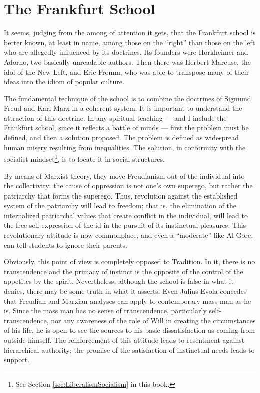 \section{The Frankfurt School}

It seems, judging from the among of attention it gets, that the Frankfurt school is better known, at least in name, among those on the ``right'' than those on the left who are allegedly influenced by its doctrines. Its founders were Horkheimer and Adorno, two basically unreadable authors. Then there was Herbert Marcuse, the idol of the New Left, and Eric Fromm, who was able to transpose many of their ideas into the idiom of popular culture.

The fundamental technique of the school is to combine the doctrines of Sigmund Freud and Karl Marx in a coherent system. It is important to understand the attraction of this doctrine. In any spiritual teaching --- and I include the Frankfurt school, since it reflects a battle of minds --- first the problem must be defined, and then a solution proposed. The problem is defined as widespread human misery resulting from inequalities. The solution, in conformity with the socialist mindset\footnote{See Section \ref{sec:LiberalismSocialism} in this book.}, is to locate it in social structures.

By means of Marxist theory, they move Freudianism out of the individual into the collectivity: the cause of oppression is not one's own superego, but rather the patriarchy that forms the superego. Thus, revolution against the established system of the patriarchy will lead to freedom; that is, the elimination of the internalized patriarchal values that create conflict in the individual, will lead to the free self-expression of the id in the pursuit of its instinctual pleasures. This revolutionary attitude is now commonplace, and even a ``moderate'' like Al Gore, can tell students to ignore their parents.

Obviously, this point of view is completely opposed to Tradition. In it, there is no transcendence and the primacy of instinct is the opposite of the control of the appetites by the spirit. Nevertheless, although the school is false in what it denies, there may be some truth in what it asserts. Even Julius Evola concedes that Freudian and Marxian analyses can apply to contemporary mass man as he is. Since the mass man has no sense of transcendence, particularly self-transcendence, nor any awareness of the role of Will in creating the circumstances of his life, he is open to see the sources to his basic dissatisfaction as coming from outside himself. The reinforcement of this attitude leads to resentment against hierarchical authority; the promise of the satisfaction of instinctual needs leads to support.

